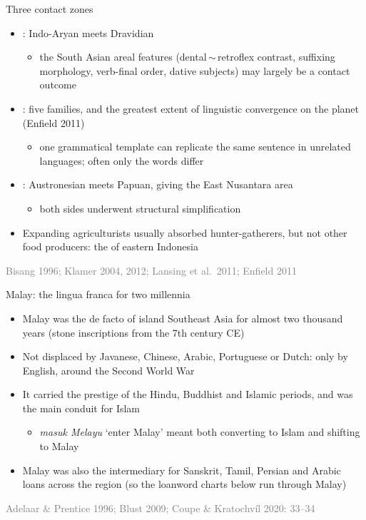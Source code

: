 \documentclass{beamer}
\newcommand{\asrc}[1]{{\par\raggedleft\tiny\textcolor{gray}{#1}\par}}
\begin{document}
\begin{frame}{Three contact zones}
  \begin{itemize}
  \item {}: Indo-Aryan meets Dravidian
    \begin{itemize}
    \item the South Asian areal features (dental\,$\sim$\,retroflex contrast,
      suffixing morphology, verb-final order, dative subjects) may largely
      be a contact outcome
    \end{itemize}
  \item {}: five families, and the greatest
    extent of linguistic convergence on the planet (Enfield 2011)
    \begin{itemize}
    \item one grammatical template can replicate the same sentence in
      unrelated languages; often only the words differ
    \end{itemize}
  \item {}: Austronesian meets Papuan, giving the
    East Nusantara area
    \begin{itemize}
    \item both sides underwent structural simplification
    \end{itemize}
  \item Expanding agriculturists usually absorbed hunter-gatherers, but not
    other food producers: the  of eastern Indonesia
  \end{itemize}
  \asrc{Bisang 1996; Klamer 2004, 2012; Lansing et al.\ 2011; Enfield 2011}
\end{frame}

\begin{frame}{Malay: the lingua franca for two millennia}
  \begin{itemize}
  \item Malay was the de facto  of island Southeast Asia
    for almost two thousand years (stone inscriptions from the 7th century CE)
  \item Not displaced by Javanese, Chinese, Arabic, Portuguese or Dutch:
    only by English, around the Second World War
  \item It carried the prestige of the Hindu, Buddhist and Islamic periods, and
    was the main conduit for Islam
    \begin{itemize}
    \item \emph{masuk Melayu} `enter Malay' meant both converting to Islam
      and shifting to Malay
    \end{itemize}
  \item Malay was also the intermediary for Sanskrit, Tamil, Persian and
    Arabic loans across the region (so the loanword charts below run through
    Malay)
  \end{itemize}
  \asrc{Adelaar \& Prentice 1996; Blust 2009; Coupe \& Kratochvíl 2020: 33--34}
\end{frame}
\end{document}
